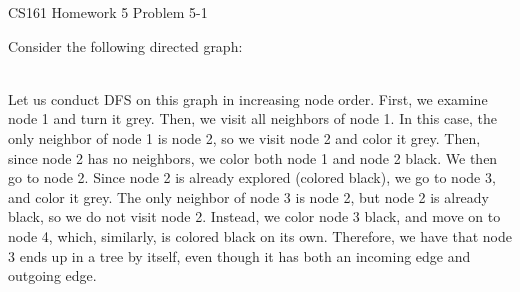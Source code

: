 \documentclass[12pt]{article}
\begin{document}
\begin{center}
{\Large CS161 Homework 5 Problem 5-1}

\end{center}
Consider the following directed graph:\\
\usetikzlibrary{arrows}
\\
Let us conduct DFS on this graph in increasing node order. First, we examine node 1 and turn it grey. Then, we visit all neighbors of node 1. In this case, the only neighbor of node 1 is node 2, so we visit node 2 and color it grey. Then, since node 2 has no neighbors, we color both node 1 and node 2 black. We then go to node 2. Since node 2 is already explored (colored black), we go to node 3, and color it grey. The only neighbor of node 3 is node 2, but node 2 is already black, so we do not visit node 2. Instead, we color node 3 black, and move on to node 4, which, similarly, is colored black on its own. Therefore, we have that node 3 ends up in a tree by itself, even though it has both an incoming edge and outgoing edge.
\end{document}
